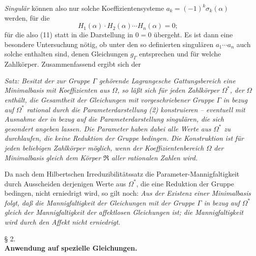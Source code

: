 \emph{Singulär} können also nur solche Koeffizientensysteme $a_k=(-1)^k\sigma_k(\alpha)$ werden, für die
\[
H_1(\alpha)\cdot H_2(\alpha)\cdots H_n(\alpha)=0;
\]
für die also (11) statt in die Darstellung in $0=0$ übergeht. Es ist dann eine besondere Untersuchung nötig, ob unter den so definierten singulären $a_1\cdots a_n$ auch solche enthalten sind, denen Gleichungen $g_\Gamma$ entsprechen und für welche Zahlkörper. Zusammenfassend ergibt sich der

\emph{Satz: Besitzt der zur Gruppe $\Gamma$ gehörende Lagrangesche Gattungsbereich eine Minimalbasis} \emph{mit Koeffizienten aus $\Omega$, so läßt sich für jeden Zahlkörper $\Omega^*$, der $\Omega$ enthält, die Gesamtheit der Gleichungen mit vorgeschriebener Gruppe $\Gamma$ in bezug auf $\Omega^*$ rational durch die Parameterdarstellung (2) konstruieren -- eventuell mit Ausnahme der in bezug auf die Parameterdarstellung singulären, die sich gesondert angeben lassen. Die Parameter haben dabei alle Werte aus $\Omega^*$ zu durchlaufen, die keine Reduktion der Gruppe bedingen. Die Konstruktion ist für jeden beliebigen Zahlkörper möglich, wenn der Koeffizientenbereich $\Omega$ der Minimalbasis gleich dem Körper $\mathfrak R$ aller rationalen Zahlen wird.}

Da nach dem Hilbertschen Irreduzibilitätssatz die Parameter-Mannigfaltigkeit durch Ausscheiden derjenigen Werte aus $\Omega^*$, die eine Reduktion der Gruppe bedingen, nicht erniedrigt wird, so gilt noch: \emph{Aus der Existenz einer Minimalbasis folgt, daß die Mannigfaltigkeit der Gleichungen mit der Gruppe $\Gamma$ in bezug auf $\Omega^*$ gleich der Mannigfaltigkeit der affektlosen Gleichungen ist; die Mannigfaltigkeit wird durch den Affekt nicht erniedrigt.}

\begin{center}
§ 2.\\[0.75em]
\textbf{Anwendung auf spezielle Gleichungen.}
\end{center}

